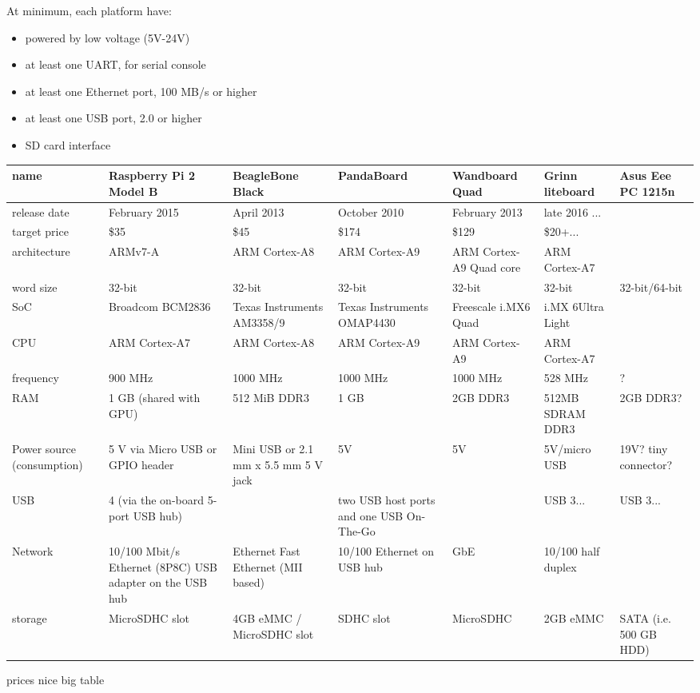 \documentclass[printmode]{mgr}
\begin{document}
At minimum, each platform have:
\begin{itemize}
  \item powered by low voltage (5V-24V)
  \item at least one UART, for serial console
  \item at least one Ethernet port, 100 MB/s or higher
  \item at least one USB port, 2.0 or higher
  \item SD card interface
\end{itemize}

\renewcommand{\arraystretch}{2}
\begin{center}
  \begin{tabular}{| p{2cm} | p{2cm} | p{2cm} | p{2cm} | p{2cm} | p{2cm} | p{2cm} |}
    \hline
    name & Raspberry Pi 2 Model B & BeagleBone Black & PandaBoard & Wandboard Quad & Grinn liteboard & Asus Eee PC 1215n \\
    \hline
    release date & February 2015 & April 2013 & October 2010 & February 2013 & late 2016 ... &\\
    \hline
    target price & \$35 & \$45 & \$174 & \$129 & \$20+... &\\
    \hline
    architecture & ARMv7-A & ARM Cortex-A8 & ARM Cortex-A9 & ARM Cortex-A9 Quad core & ARM Cortex-A7 &\\
    \hline
    word size & 32-bit & 32-bit & 32-bit & 32-bit & 32-bit & 32-bit/64-bit \\
    \hline
    SoC & Broadcom BCM2836 & Texas Instruments AM3358/9 & Texas Instruments OMAP4430 & Freescale i.MX6 Quad & i.MX 6Ultra Light &\\
    \hline
    CPU & ARM Cortex-A7 & ARM Cortex-A8 & ARM Cortex-A9 & ARM Cortex-A9 & ARM Cortex-A7 & \\
    \hline
    frequency & 900 MHz & 1000 MHz & 1000 MHz & 1000 MHz & 528 MHz & ?\\
    \hline
    RAM & 1 GB (shared with GPU) & 512 MiB DDR3 & 1 GB & 2GB DDR3 & 512MB SDRAM DDR3  & 2GB DDR3?\\
    \hline
    Power source (consumption) & 5 V via Micro USB or GPIO header & Mini USB or 2.1 mm x 5.5 mm 5 V jack & 5V & 5V & 5V/micro USB & 19V? tiny connector?\\
    \hline
    USB & 4 (via the on-board 5-port USB hub) &  & two USB host ports and one USB On-The-Go &  & USB 3... & USB 3...\\
    \hline
    Network & 10/100 Mbit/s Ethernet (8P8C) USB adapter on the USB hub & Ethernet Fast Ethernet (MII based) & 10/100 Ethernet on USB hub & GbE & 10/100 half duplex &\\
    \hline
    storage & MicroSDHC slot & 4GB eMMC / MicroSDHC slot & SDHC slot & MicroSDHC & 2GB
    eMMC & SATA (i.e. 500 GB HDD)\\
    \hline
  \end{tabular}
\end{center}
prices
nice big table
\end{document}
